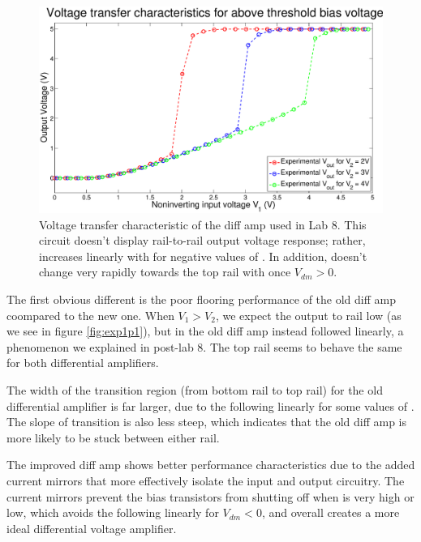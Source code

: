 \begin{figure}[H]
\centering
\includegraphics[width=\linewidth]{../Figures/OldVTC.eps}
\caption{Voltage transfer characteristic of the diff amp used in Lab 8. This circuit doesn't display rail-to-rail output voltage response; rather, \Vout increases linearly with \Vin for negative values of \Vdm. In addition, \Vout doesn't change very rapidly towards the top rail with once $V_{dm} > 0$.}
\label{fig:oldvtc}
\end{figure}

The first obvious different is the poor flooring performance of the old diff amp coompared to the new one. When $V_1 > V_2$, we expect the output to rail low (as we see in figure \ref{fig:exp1p1}), but in the old diff amp \Vout instead followed \Vone linearly, a phenomenon we explained in post-lab 8. The top rail seems to behave the same for both differential amplifiers.

The width of the transition region (from bottom rail to top rail) for the old differential amplifier is far larger, due to the \Vout following \Vone linearly for some values of \Vone. The slope of transition is also less steep, which indicates that the old diff amp is more likely to be stuck between either rail.

The improved diff amp shows better performance characteristics due to the added current mirrors that more effectively isolate the input and output circuitry. The current mirrors prevent the bias transistors from shutting off when \Vout is very high or low, which avoids the \Vout following \Vin linearly for $V_{dm} < 0$, and overall creates a more ideal differential voltage amplifier.